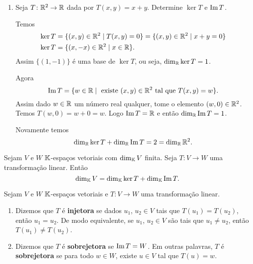 \begin{exemplos}
\begin{enumerate}[label={\arabic*})]
    \item Seja $T \colon \mathbb{R}^2 \to \mathbb{R}$ dada por $T(x,y) = x + y$. Determine $\ker T$ e ${\rm Im\,} T$.
    \begin{solucao}
      Temos
      \begin{align*}
        \ker T &= \{(x,y) \in \mathbb{R}^2 \mid T(x,y) = 0\} = \{(x,y) \in \mathbb{R}^2 \mid x + y = 0\}\\
        \ker T &= \{(x,-x) \in \mathbb{R}^2 \mid x \in \mathbb{R}\}.
      \end{align*}
      Assim $\{(1,-1)\}$ \'e uma base de $\ker T$, ou seja, $\dim_{\mathbb{R}}\ker T = 1$.

      Agora
      \[
        {\rm Im\,} T = \{w \in \mathbb{R} \mid \mbox{ existe } (x,y) \in \mathbb{R}^2 \mbox{ tal que } T(x,y) = w\}.
      \]
      Assim dado $w \in \mathbb{R}$ um n\'umero real qualquer, tome o elemento $(w,0) \in \mathbb{R}^2$. Temos $T(w,0) = w + 0 = w$. Logo ${\rm Im\,} T = \mathbb{R}$ e ent\~ao $\dim_{\mathbb{R}}{\rm Im\,} T = 1$.

      Novamente temos
      \[
        \dim_{\mathbb{R}}\ker T + \dim_{\mathbb{R}}{\rm Im\,} T = 2 = \dim_{\mathbb{R}}\mathbb{R}^2.
      \]
    \end{solucao}
  \end{enumerate}
\end{exemplos}

\begin{teorema}\label{teorema_do_nucleo_e_da_imagem}
  Sejam $V$ e $W$ $\mathbb{K}$-espa\c{c}os vetoriais com $\dim_{\mathbb{K}}V$ finita. Seja $T : V \to W$ uma transforma\c{c}\~ao linear. Ent\~ao
  \[
    \dim_{\mathbb{K}}V = \dim_{\mathbb{K}}\ker T + \dim_{\mathbb{K}}{\rm Im\,} T.
  \]
\end{teorema}

\begin{definicao}
  Sejam $V$ e $W$ $\mathbb{K}$-espa\c{c}os vetoriais e $T \colon V \to W$ uma transforma\c{c}\~ao linear.
  \begin{enumerate}[label={\roman*})]
    \item Dizemos que $T$ \'e \textbf{injetora} se dados $u_1$, $u_2 \in V$ tais que $T(u_1) = T(u_2)$, ent\~ao $u_1 = u_2$. De modo equivalente, se $u_1$, $u_2 \in V$ s\~ao tais que $u_1 \ne u_2$, ent\~ao $T(u_1) \ne T(u_2)$.

    \item Dizemos que $T$ \'e \textbf{sobrejetora} se ${\rm Im\,} T = W$. Em outras palavras, $T$ \'e \textbf{sobrejetora} se para todo $w \in W$, existe $u \in V$ tal que $T(u) = w$.
  \end{enumerate}
\end{definicao}

